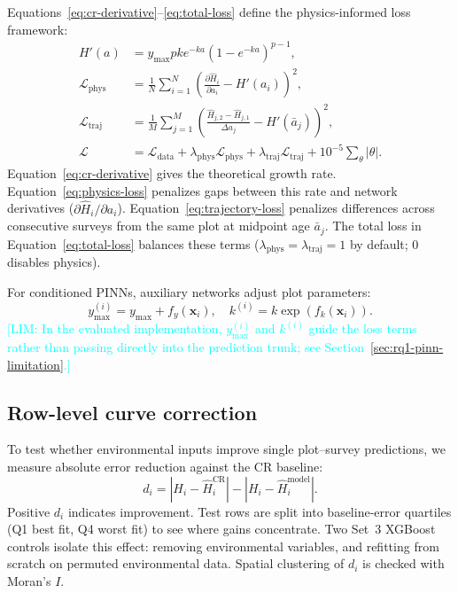 \documentclass[logo,msc,ai]{infthesis}           %
\newcommand{\limit}[1]{\textcolor{cyan}{[LIM: #1]}}
\begin{document}
Equations~\eqref{eq:cr-derivative}--\eqref{eq:total-loss} define the physics-informed loss framework:
\begin{align}
H'(a) &= y_{\max}pk e^{-ka}\left(1-e^{-ka}\right)^{p-1}, \label{eq:cr-derivative} \\
\mathcal{L}_{\mathrm{phys}} &= \frac{1}{N}\sum_{i=1}^{N}\left(\frac{\partial\hat H_i}{\partial a_i}-H'(a_i)\right)^2, \label{eq:physics-loss} \\
\mathcal{L}_{\mathrm{traj}} &= \frac{1}{M}\sum_{j=1}^{M}\left(\frac{\hat H_{j,2}-\hat H_{j,1}}{\Delta a_j}-H'(\bar a_j)\right)^2, \label{eq:trajectory-loss} \\
\mathcal{L} &= \mathcal{L}_{\mathrm{data}} + \lambda_{\mathrm{phys}}\mathcal{L}_{\mathrm{phys}} + \lambda_{\mathrm{traj}}\mathcal{L}_{\mathrm{traj}} + 10^{-5}\sum_{\theta}|\theta|. \label{eq:total-loss}
\end{align}
Equation~\eqref{eq:cr-derivative} gives the theoretical growth rate. Equation~\eqref{eq:physics-loss} penalizes gaps between this rate and network derivatives ($\partial\hat H_i/\partial a_i$). Equation~\eqref{eq:trajectory-loss} penalizes differences across consecutive surveys from the same plot at midpoint age $\bar a_j$. The total loss in Equation~\eqref{eq:total-loss} balances these terms ($\lambda_{\mathrm{phys}}=\lambda_{\mathrm{traj}}=1$ by default; 0 disables physics). 

For conditioned PINNs, auxiliary networks adjust plot parameters:
\begin{equation}
y_{\max}^{(i)} = y_{\max}+f_y(\mathbf{x}_i), \quad k^{(i)} = k\exp\!\left(f_k(\mathbf{x}_i)\right).
\label{eq:param-adjust}
\end{equation}
\limit{In the evaluated implementation, $y_{\max}^{(i)}$ and $k^{(i)}$ guide the loss terms rather than passing directly into the prediction trunk; see Section~\ref{sec:rq1-pinn-limitation}.}

\subsection*{Row-level curve correction}
\label{sec:rq2a-method}
To test whether environmental inputs improve single plot--survey predictions, we measure absolute error reduction against the CR baseline:
\begin{equation}
d_i = \left|H_i-\hat H_i^{\mathrm{CR}}\right| - \left|H_i-\hat H_i^{\mathrm{model}}\right|.
\label{eq:residual-reduction}
\end{equation}
Positive $d_i$ indicates improvement. Test rows are split into baseline-error quartiles (Q1 best fit, Q4 worst fit) to see where gains concentrate. Two Set~3 XGBoost controls isolate this effect: removing environmental variables, and refitting from scratch on permuted environmental data. Spatial clustering of $d_i$ is checked with Moran's $I$.
\end{document}
